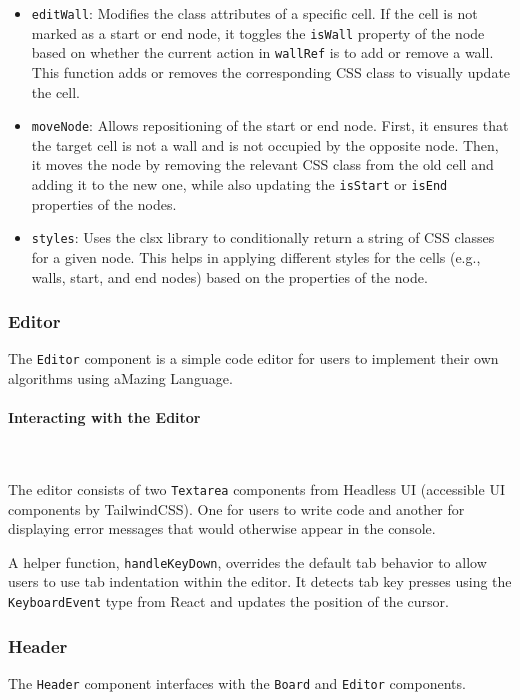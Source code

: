 \begin{itemize}
    \item \texttt{editWall}: Modifies the class attributes of a specific cell. If the cell is not marked as a start or end node, it toggles the \texttt{isWall} property of the node based on whether the current action in \texttt{wallRef} is to add or remove a wall. This function adds or removes the corresponding CSS class to visually update the cell.
    \item \texttt{moveNode}: Allows repositioning of the start or end node. First, it ensures that the target cell is not a wall and is not occupied by the opposite node. Then, it moves the node by removing the relevant CSS class from the old cell and adding it to the new one, while also updating the \texttt{isStart} or \texttt{isEnd} properties of the nodes.
    \item \texttt{styles}: Uses the clsx library to conditionally return a string of CSS classes for a given node. This helps in applying different styles for the cells (e.g., walls, start, and end nodes) based on the properties of the node.
\end{itemize}

\subsubsection{Editor}
The \texttt{Editor} component is a simple code editor for users to implement their own algorithms using aMazing Language.

\paragraph{Interacting with the Editor} \

The editor consists of two \texttt{Textarea} components from Headless UI (accessible UI components by TailwindCSS). One for users to write code and another for displaying error messages that would otherwise appear in the console.

A helper function, \texttt{handleKeyDown}, overrides the default tab behavior to allow users to use tab indentation within the editor. It detects tab key presses using the \texttt{KeyboardEvent} type from React and updates the position of the cursor.

\subsubsection{Header}
The \texttt{Header} component interfaces with the \texttt{Board} and \texttt{Editor} components.

